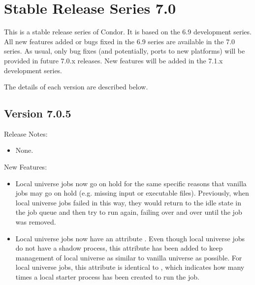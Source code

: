 
\section{\label{sec:History-7-0}Stable Release Series 7.0}

This is a stable release series of Condor.
It is based on the 6.9 development series.
All new features added or bugs fixed in the 6.9 series are available
in the 7.0 series.
As usual, only bug fixes (and potentially, ports to new platforms)
will be provided in future 7.0.x releases.
New features will be added in the 7.1.x development series.

The details of each version are described below.


\subsection*{\label{sec:New-7-0-5}Version 7.0.5}

\noindent Release Notes:

\begin{itemize}

\item None.

\end{itemize}


\noindent New Features:

\begin{itemize}

\item Local universe jobs now go on hold for the same specific reasons that
vanilla jobs may go on hold (e.g. missing input or executable files).
Previously, when local universe jobs failed in this way, they would return
to the idle state in the job queue and then try to run again, failing
over and over until the job was removed.

\item Local universe jobs now have an attribute .
Even though local universe jobs do not have a shadow process, this attribute
has been added to keep management of local universe as similar to
vanilla universe as possible.  For local universe jobs, this attribute
is identical to , which indicates how many times a
local starter process has been created to run the job.

\end{itemize}


